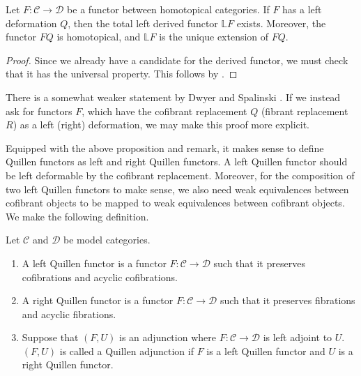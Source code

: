\documentclass[../thesis.tex]{subfiles}
\begin{document}
            \begin{proposition}
                Let $F:\mathcal{C}\rightarrow\mathcal{D}$ be a functor between homotopical categories. If $F$ has a left deformation $Q$, then the total left derived functor $\mathbb{L}F$ exists. Moreover, the functor $FQ$ is homotopical, and $\mathbb{L}F$ is the unique extension of $FQ$.
            \end{proposition}

            \begin{proof}
                Since we already have a candidate for the derived functor, we must check that it has the universal property. This follows by \cite[Proposition 6.4.11][207]{Riehl16}.
            \end{proof}

            \begin{remark}
                There is a somewhat weaker statement by Dwyer and Spalinski \cite[Proposition 9.3][111]{Dwyer95}. If we instead ask for functors $F$, which have the cofibrant replacement $Q$ (fibrant replacement $R$) as a left (right) deformation, we may make this proof more explicit.
            \end{remark}

            Equipped with the above proposition and remark, it makes sense to define Quillen functors as left and right Quillen functors. A left Quillen functor should be left deformable by the cofibrant replacement. Moreover, for the composition of two left Quillen functors to make sense, we also need weak equivalences between cofibrant objects to be mapped to weak equivalences between cofibrant objects. We make the following definition.

            \begin{definition}
                Let $\mathcal{C}$ and $\mathcal{D}$ be model categories. \begin{enumerate}
                    \item A left Quillen functor is a functor $F:\mathcal{C}\rightarrow\mathcal{D}$ such that it preserves cofibrations and acyclic cofibrations.
                    \item A right Quillen functor is a functor $F:\mathcal{C}\rightarrow\mathcal{D}$ such that it preserves fibrations and acyclic fibrations.
                    \item Suppose that $(F,U)$ is an adjunction where $F:\mathcal{C}\rightarrow\mathcal{D}$ is left adjoint to $U$. $(F,U)$ is called a Quillen adjunction if $F$ is a left Quillen functor and $U$ is a right Quillen functor.
                \end{enumerate}
            \end{definition}
\end{document}

